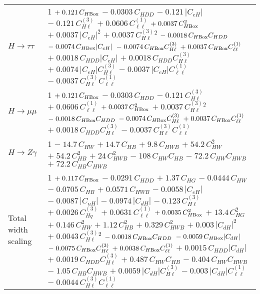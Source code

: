 \begin{tabular}{l|p{}}
    $H \rightarrow \tau\tau$ & 1 $+\;0.121\,C_{H\rm{Box}}$ $-\;0.0303\,C_{HDD}$ $-\;0.121\,|C_{eH}|$ $-\;0.121\,C^{(3)}_{H\ell}$ $+\;0.0606\,C^{(1)}_{\ell\ell}$ $+\;0.0037\,C_{H\rm{Box}}^{2}$ $+\;0.0037\,|C_{eH}|^{2}$ $+\;0.0037\,C^{(3)}_{H\ell}^{2}$ $-\;0.0018\,C_{H\rm{Box}}C_{HDD}$ $-\;0.0074\,C_{H\rm{Box}}|C_{eH}|$ $-\;0.0074\,C_{H\rm{Box}}C^{(3)}_{H\ell}$ $+\;0.0037\,C_{H\rm{Box}}C^{(1)}_{\ell\ell}$ $+\;0.0018\,C_{HDD}|C_{eH}|$ $+\;0.0018\,C_{HDD}C^{(3)}_{H\ell}$ $+\;0.0074\,|C_{eH}|C^{(3)}_{H\ell}$ $-\;0.0037\,|C_{eH}|C^{(1)}_{\ell\ell}$ $-\;0.0037\,C^{(3)}_{H\ell}C^{(1)}_{\ell\ell}$ \\
    $H \rightarrow \mu\mu$ & 1 $+\;0.121\,C_{H\rm{Box}}$ $-\;0.0303\,C_{HDD}$ $-\;0.121\,C^{(3)}_{H\ell}$ $+\;0.0606\,C^{(1)}_{\ell\ell}$ $+\;0.0037\,C_{H\rm{Box}}^{2}$ $+\;0.0037\,C^{(3)}_{H\ell}^{2}$ $-\;0.0018\,C_{H\rm{Box}}C_{HDD}$ $-\;0.0074\,C_{H\rm{Box}}C^{(3)}_{H\ell}$ $+\;0.0037\,C_{H\rm{Box}}C^{(1)}_{\ell\ell}$ $+\;0.0018\,C_{HDD}C^{(3)}_{H\ell}$ $-\;0.0037\,C^{(3)}_{H\ell}C^{(1)}_{\ell\ell}$ \\
    $H \rightarrow Z\gamma$ & 1 $-\;14.7\,C_{HW}$ $+\;14.7\,C_{HB}$ $+\;9.8\,C_{HWB}$ $+\;54.2\,C_{HW}^{2}$ $+\;54.2\,C_{HB}^{2}$ $+\;24\,C_{HWB}^{2}$ $-\;108\,C_{HW}C_{HB}$ $-\;72.2\,C_{HW}C_{HWB}$ $+\;72.2\,C_{HB}C_{HWB}$ \\
    \hline
    Total width scaling & 1 $+\;0.117\,C_{H\rm{Box}}$ $-\;0.0291\,C_{HDD}$ $+\;1.37\,C_{HG}$ $-\;0.0444\,C_{HW}$ $-\;0.0705\,C_{HB}$ $+\;0.0571\,C_{HWB}$ $-\;0.0058\,|C_{eH}|$ $-\;0.0087\,|C_{uH}|$ $-\;0.0974\,|C_{dH}|$ $-\;0.123\,C^{(3)}_{H\ell}$ $+\;0.0026\,C^{(3)}_{Hq}$ $+\;0.0631\,C^{(1)}_{\ell\ell}$ $+\;0.0035\,C_{H\rm{Box}}^{2}$ $+\;13.4\,C_{HG}^{2}$ $+\;0.146\,C_{HW}^{2}$ $+\;1.12\,C_{HB}^{2}$ $+\;0.329\,C_{HWB}^{2}$ $+\;0.003\,|C_{dH}|^{2}$ $+\;0.0043\,C^{(3)}_{H\ell}^{2}$ $-\;0.0018\,C_{H\rm{Box}}C_{HDD}$ $-\;0.0059\,C_{H\rm{Box}}|C_{dH}|$ $-\;0.0075\,C_{H\rm{Box}}C^{(3)}_{H\ell}$ $+\;0.0038\,C_{H\rm{Box}}C^{(1)}_{\ell\ell}$ $+\;0.0015\,C_{HDD}|C_{dH}|$ $+\;0.0019\,C_{HDD}C^{(3)}_{H\ell}$ $+\;0.487\,C_{HW}C_{HB}$ $-\;0.404\,C_{HW}C_{HWB}$ $-\;1.05\,C_{HB}C_{HWB}$ $+\;0.0059\,|C_{dH}|C^{(3)}_{H\ell}$ $-\;0.003\,|C_{dH}|C^{(1)}_{\ell\ell}$ $-\;0.0044\,C^{(3)}_{H\ell}C^{(1)}_{\ell\ell}$ \\
    \hline
\end{tabular}